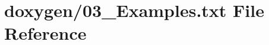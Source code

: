 \hypertarget{03__Examples_8txt}{\section{doxygen/03\+\_\+\+Examples.txt File Reference}
\label{03__Examples_8txt}
}
